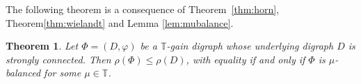 \documentclass[12pt]{article}
\newtheorem{theorem}{Theorem}[section]
\theoremstyle{definition}
\newcommand{\TT}{\mathbb{T}}
\begin{document}
The following theorem is a consequence of Theorem~\ref{thm:horn}, Theorem\ref{thm:wielandt} and Lemma \ref{lem:mubalance}.

\begin{theorem}\label{thm:rho-comparison}
Let $\Phi=(D,\varphi)$ be a $\TT$-gain digraph whose underlying digraph $D$ is strongly connected. Then $\rho(\Phi)\le\rho(D)$, with equality if and only if $\Phi$ is $\mu$-balanced for some $\mu\in\TT$.
\end{theorem}


\end{document}
